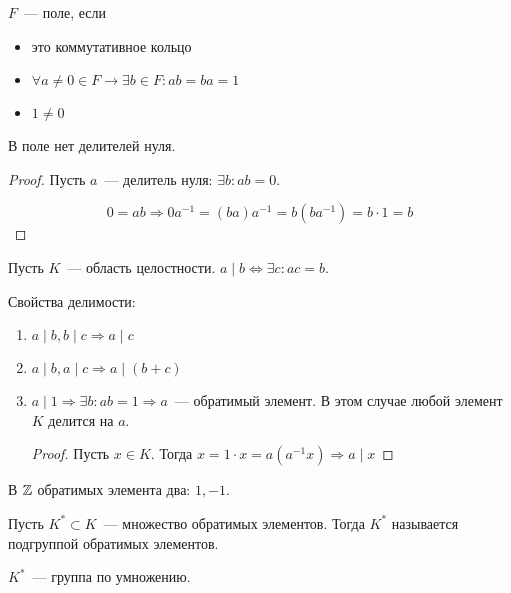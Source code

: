 \begin{define*}
  $F$~--- поле, если
  \begin{itemize}
    \item это коммутативное кольцо
      \item $\forall a\ne 0 \in F \to \exists b \in F : ab = ba = 1$
      \item $1 \ne 0$
  \end{itemize}
\end{define*}

\begin{claim}
  В поле нет делителей нуля.
\end{claim}

\begin{proof}
  Пусть $a$~--- делитель нуля: $\exists b : ab = 0$.

  $$
    0 = ab \Rightarrow 0a^{-1} = (ba)a^{-1} = b(ba^{-1}) = b\cdot 1 = b
  $$
\end{proof}

Пусть $K$~--- область целостности.
$a \mid b \Leftrightarrow \exists c : ac = b$.

Свойства делимости:

\begin{enumerate}
  \item $a \mid b, b \mid c \Rightarrow a \mid c$
    \item $a \mid b, a \mid c \Rightarrow a \mid (b+c)$
    \item $a \mid 1 \Rightarrow \exists b : ab = 1 \Rightarrow a$~--- обратимый элемент.
      В этом случае любой элемент $K$ делится на $a$.

      \begin{proof}
        Пусть $x\in K$. Тогда $x = 1\cdot x = a(a^{-1}x) \Rightarrow a\mid x$
      \end{proof}
\end{enumerate}

\begin{example}
  В $\mathbb{Z}$ обратимых элемента два: $1, -1$.
\end{example}

\begin{define*}
  Пусть $K^* \subset K$~--- множество обратимых элементов. Тогда $K^*$ называется подгруппой обратимых элементов.
\end{define*}

\begin{exercise}
  $K^*$~--- группа по умножению.
\end{exercise}


